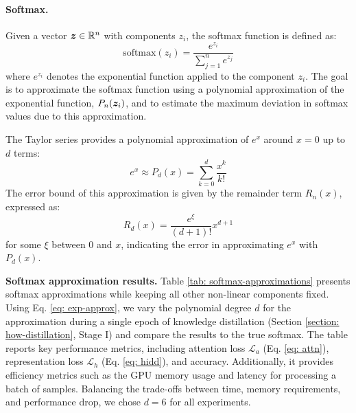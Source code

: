 \paragraph{Softmax.} Given a vector ${\bm{z}} \in \mathbb{R}^n$ with components $z_i$, the softmax function is defined as: 
\begin{equation*}
    \text{softmax}(z_i) = \dfrac{e^{z_i}}{\sum_{j=1}^n e^{z_j}}
\end{equation*}
where $e^{z_i}$ denotes the exponential function applied to the component $z_i$. The goal is to approximate the softmax function using a polynomial approximation of the exponential function, $P_n({\bm{z}}_i)$, and to estimate the maximum deviation in softmax values due to this approximation. 

\noindent The Taylor series provides a polynomial approximation of $e^x$ around $x=0$ up to $d$ terms: 
\begin{equation*}
    e^x \approx P_d(x) = \sum_{k=0}^d \dfrac{x^k}{k!} 
\end{equation*}
The error bound of this approximation is given by the remainder term $R_n(x)$, expressed as: 
\begin{equation*}
    R_d(x) = \dfrac{e^{\xi}}{(d+1)!} x^{d+1} 
\end{equation*}
for some $\xi$ between $0$ and $x$, indicating the error in approximating $e^x$ with $P_d(x)$. 

\noindent \textbf{Softmax approximation results.} Table \ref{tab: softmax-approximations} presents softmax approximations while keeping all other non-linear components fixed. Using Eq. \ref{eq: exp-approx}, we vary the polynomial degree $d$ for the approximation during a single epoch of knowledge distillation (Section \ref{section: how-distillation}, Stage I) and compare the results to the true softmax. The table reports key performance metrics, including attention loss $\mathcal{L}_a$ (Eq. \ref{eq: attn}), representation loss $\mathcal{L}_h$ (Eq. \ref{eq: hidd}), and accuracy. Additionally, it provides efficiency metrics such as the GPU memory usage and latency for processing a batch of samples. Balancing the trade-offs between time, memory requirements, and performance drop, we chose $d=6$ for all experiments. 

